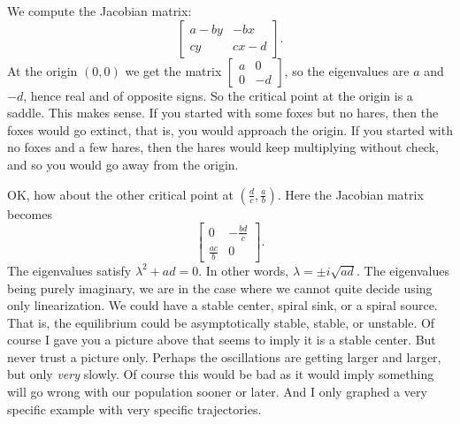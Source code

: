 \documentclass{ximera}
\begin{document}
We compute the Jacobian matrix:
\begin{equation*}
    \begin{bmatrix}
        a-by & -bx \\
        cy & cx-d
    \end{bmatrix} .
\end{equation*}
At the origin $(0,0)$ we get the matrix
$\left[ \begin{smallmatrix}
    a & 0 \\
    0 & -d
\end{smallmatrix} \right]$, 
so the eigenvalues are $a$ and $-d$, hence real and of opposite signs.  So the critical point at the origin is a saddle. This makes sense.  If you started with some foxes but no hares, then the foxes would go extinct, that is, you would approach the origin.  If you started with no foxes and a few hares, then the hares would keep multiplying without check, and so you would go away from the origin.

OK\@, how about the other critical point at $(\frac{d}{c},\frac{a}{b})$.  Here the Jacobian matrix becomes
\begin{equation*}
    \begin{bmatrix}
        0 & -\frac{bd}{c} \\
        \frac{ac}{b} & 0
    \end{bmatrix} .
\end{equation*}
The eigenvalues satisfy $\lambda^2 + ad = 0$.  In other words, $\lambda = \pm i \sqrt{ad}$.  The eigenvalues being purely imaginary, we are in the case where we cannot quite decide using only linearization.  We could have a stable center, spiral sink, or a spiral source.  That is, the equilibrium could be asymptotically stable, stable, or unstable.  Of course I gave you a picture above that seems to imply it is a stable center.  But never trust a picture only.  Perhaps the oscillations are getting larger and larger, but only \emph{very} slowly.  Of course this would be bad as it would imply something will go wrong with our population sooner or later.  And I only graphed a very specific example with very specific trajectories.
\end{document}
